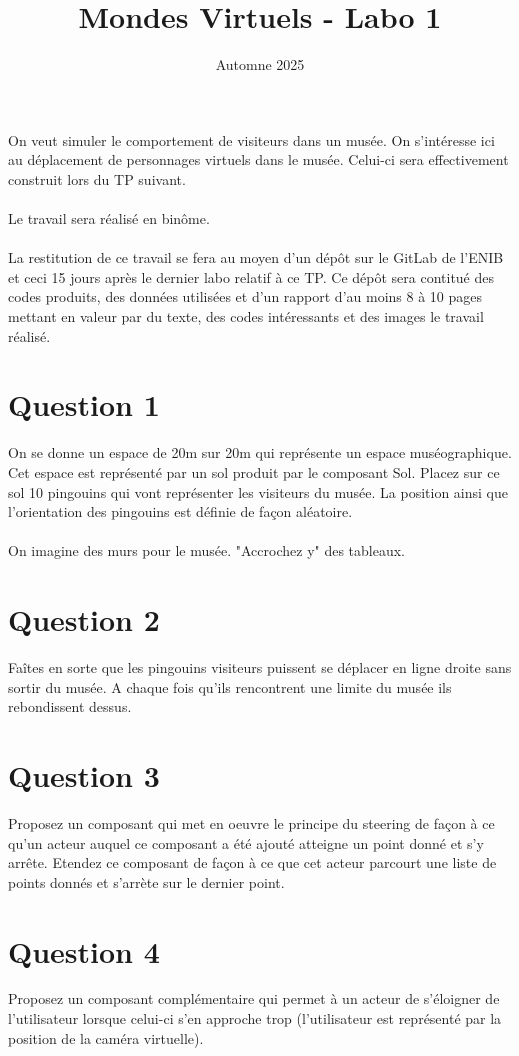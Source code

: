 \documentclass[10pt,a4paper,final,oneside,twoside,openright,openany,onecolumn]{article}
\title{Mondes Virtuels - Labo  1}
\date{Automne 2025}
\begin{document}
	\maketitle
	On veut simuler le comportement de visiteurs dans un musée. On s'intéresse ici au déplacement de personnages virtuels dans le musée. Celui-ci sera effectivement construit lors du TP suivant.
\\
\\
Le travail sera réalisé en binôme.
\\
\\
La restitution de ce travail se fera au moyen d'un dépôt sur le GitLab de l'ENIB et ceci 15 jours après le dernier labo relatif à ce TP. Ce dépôt sera contitué des codes produits, des données utilisées et d'un rapport d'au moins 8 à 10 pages mettant en valeur par du texte, des codes intéressants et des images le travail réalisé.
	\section*{Question 1}
	On se donne un espace de 20m sur 20m qui représente un espace muséographique. Cet espace est représenté par un sol produit par le composant Sol. Placez sur ce sol 10 pingouins qui vont représenter les visiteurs du musée. La position ainsi que l'orientation des pingouins est définie de façon aléatoire. 
	\\ \\
	On imagine des murs pour le musée. "Accrochez y" des tableaux.
	
	
	\section*{Question 2} 
	Faîtes en sorte que les pingouins visiteurs puissent se déplacer en ligne droite sans sortir du musée. A chaque fois qu'ils rencontrent une limite du musée ils rebondissent dessus.
	
	\section*{Question 3}
	Proposez un composant qui met en oeuvre le principe du steering de façon à ce qu'un acteur auquel ce composant a été ajouté atteigne un point donné et s'y arrête. Etendez ce composant de façon à ce que cet acteur parcourt une liste de points donnés et s'arrète sur le dernier point.
	
	\section*{Question 4}
	Proposez un composant complémentaire qui permet à un acteur de s'éloigner de l'utilisateur lorsque celui-ci s'en approche trop (l'utilisateur est représenté par la position de la caméra virtuelle).
	
\end{document}
